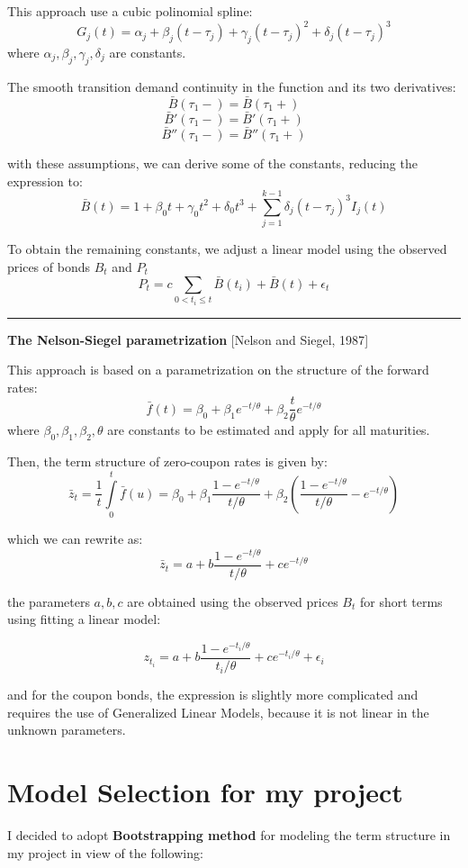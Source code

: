 \documentclass[letterpaper,10pt,english]{/anaconda/lib/python2.7/site-packages/sphinx/texinputs/sphinxhowto}
\begin{document}
This approach use a cubic polinomial spline:
\[ G_j(t) = \alpha_j + \beta_j (t-\tau_j) + \gamma_j (t-\tau_j)^2 + \delta_j (t-\tau_j)^3 \]
where $\alpha_j, \beta_j, \gamma_j, \delta_j$ are constants.

The smooth transition demand continuity in the function and its two
derivatives: \[\bar{B}(\tau_1-)=\bar{B}(\tau_1+)\]
\[\bar{B}'(\tau_1-)=\bar{B}'(\tau_1+)\]
\[\bar{B}''(\tau_1-)=\bar{B}''(\tau_1+)\]

with these assumptions, we can derive some of the constants, reducing
the expression to:
\[\bar{B}(t)=1+\beta_0 t + \gamma_0 t^2 + \delta_0 t^3 + \sum\limits_{j=1}^{k-1} \delta_j (t-\tau_j)^3 I_j(t) \]

To obtain the remaining constants, we adjust a linear model using the
observed prices of bonds $B_t$ and $P_t$
\[ P_t = c \sum\limits_{0< t_i \leq t } \bar{B}(t_i) + \bar{B}(t) + \epsilon_t \]

\begin{center}\rule{3in}{0.4pt}\end{center}

\textbf{The Nelson-Siegel parametrization} {[}Nelson and Siegel, 1987{]}

This approach is based on a parametrization on the structure of the
forward rates:
\[ \bar{f}(t)=\beta_0+\beta_1 e^{-t/\theta}+\beta_2\frac{t}{\theta}e^{-t/\theta} \]
where $\beta_0,\beta_1,\beta_2,\theta$ are constants to be estimated and
apply for all maturities.

Then, the term structure of zero-coupon rates is given by:
\[ \bar{z}_t = \frac{1}{t} \int\limits_{0}^{t} \bar{f}(u) = \beta_0+\beta_1 \frac{ 1- e^{-t/\theta} }{t/\theta} + \beta_2 (\frac{1-e^{-t/\theta}}{t/\theta}-e^{-t/\theta}) \]

which we can rewrite as:
\[ \bar{z}_t = a + b \frac{ 1- e^{-t/\theta} }{t/\theta} + c e^{-t/\theta} \]

the parameters $a,b,c$ are obtained using the observed prices $B_t$ for
short terms using fitting a linear model:

\[ z_{t_i} = a + b \frac{ 1- e^{-t_i/\theta} }{t_i/\theta} + c e^{-t_i/\theta} + \epsilon_i\]

and for the coupon bonds, the expression is slightly more complicated
and requires the use of Generalized Linear Models, because it is not
linear in the unknown parameters.\section{Model Selection for my project}I decided to adopt \textbf{Bootstrapping method} for modeling the term
structure in my project in view of the following:
\end{document}
